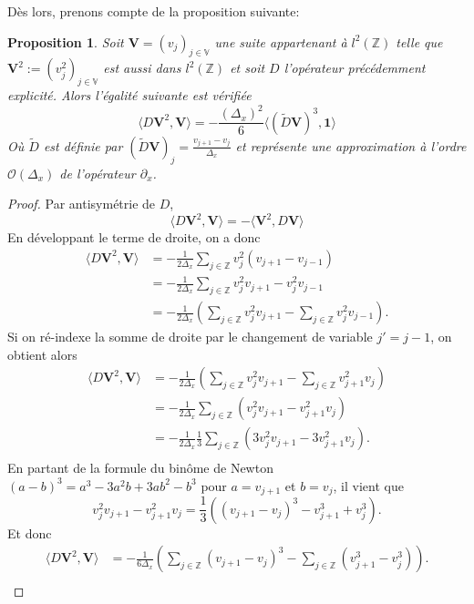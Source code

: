 \documentclass[12pt,a4paper]{article}
\newtheorem{prop}[dfn]{\textbf{Proposition}}
\numberwithin{equation}{section}
\begin{document}
Dès lors, prenons compte de la proposition suivante:
\begin{prop}
    Soit $\textbf{V} = (v_j)_{j\in\mathbb{V}}$ une suite appartenant à $l^2(\mathbb{Z})$ telle que $\textbf{V}^2:=(v_j^2)_{j\in\mathbb{V}}$ est aussi dans $l^2(\mathbb{Z})$ et soit $D$ l'opérateur précédemment explicité. Alors l'égalité suivante est vérifiée
    \begin{equation}
        \langle D \textbf{V}^2 ,\textbf{V}\rangle  = -\frac{(\Delta_x)^2}{6}\langle (\tilde{D}\textbf{V})^3,\textbf{1}\rangle 
    \end{equation}
    Où $\tilde{D}$ est définie par $(\tilde{D}\textbf{V})_j = \frac{v_{j+1}-v_j}{\Delta_x}$ et représente une approximation à l'ordre $\mathcal{O}(\Delta_x)$ de l'opérateur $\partial_x$.
\end{prop}
\begin{proof}
    Par antisymétrie de $D$, 
    $$\langle D \textbf{V}^2 ,\textbf{V}\rangle  = -\langle  \textbf{V}^2 ,D\textbf{V}\rangle $$
    En développant le terme de droite, on a donc
    \begin{equation*}
        \begin{split}
            \langle D \textbf{V}^2 ,\textbf{V}\rangle  &= -\frac{1}{2\Delta_x}\sum\limits_{j\in\mathbb{Z}}v_j^2(v_{j+1}-v_{j-1})\\
            &= -\frac{1}{2\Delta_x}\sum\limits_{j\in\mathbb{Z}}v_j^2v_{j+1}-v_j^2v_{j-1}\\
            &= -\frac{1}{2\Delta_x}\left(\sum\limits_{j\in\mathbb{Z}}v_j^2v_{j+1} - \sum\limits_{j\in\mathbb{Z}}v_j^2v_{j-1}\right) .
        \end{split}
    \end{equation*}
    Si on ré-indexe la somme de droite par le changement de variable $j'  = j-1$, on obtient alors
    \begin{equation*}
        \begin{split}
            \langle D \textbf{V}^2 ,\textbf{V}\rangle  &= -\frac{1}{2\Delta_x}\left(\sum\limits_{j\in\mathbb{Z}}v_j^2v_{j+1} - \sum\limits_{j\in\mathbb{Z}}v_{j+1}^2v_{j}\right)\\
            &= -\frac{1}{2\Delta_x}\sum\limits_{j\in\mathbb{Z}}(v_j^2v_{j+1} - v_{j+1}^2v_{j})\\
            &= -\frac{1}{2\Delta_x}\frac{1}{3}\sum\limits_{j\in\mathbb{Z}}(3v_j^2v_{j+1} - 3v_{j+1}^2v_{j}) .\\
        \end{split}
    \end{equation*}
    En partant de la formule du binôme de Newton  $(a-b)^3 = a^3 - 3a^2b + 3ab^2 - b^3$ pour $a = v_{j+1}$ et $b = v_j$, il vient que 
    $$v_j^2v_{j+1} - v_{j+1}^2v_{j} = \frac{1}{3}\left( (v_{j+1} - v_j)^3 - v_{j+1}^3 + v_j^3\right).$$
    Et donc
    \begin{equation*}
        \begin{split}
            \langle D \textbf{V}^2 ,\textbf{V}\rangle  &= -\frac{1}{6\Delta_x}\left(\sum\limits_{j\in\mathbb{Z}}(v_{j+1} - v_j)^3 - \sum\limits_{j\in\mathbb{Z}}(v_{j+1}^3 - v_j^3)\right) .\\
        \end{split}
    \end{equation*}


\end{proof}
\end{document}
